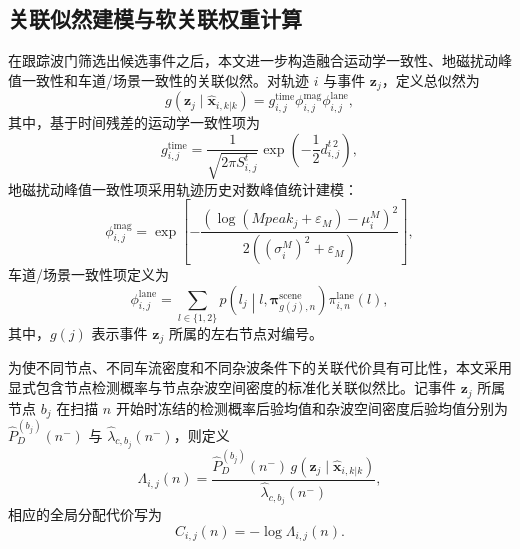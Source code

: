 \documentclass{xdupgthesis}
\begin{document}
\subsection{关联似然建模与软关联权重计算}

在跟踪波门筛选出候选事件之后，本文进一步构造融合运动学一致性、地磁扰动峰值一致性和车道/场景一致性的关联似然。对轨迹 $i$ 与事件 $\mathbf z_j$，定义总似然为
\begin{equation}
	g(\mathbf z_j\mid \hat{\mathbf x}_{i,k|k})
	=
	g_{i,j}^{\mathrm{time}}
	\phi_{i,j}^{\mathrm{mag}}
	\phi_{i,j}^{\mathrm{lane}},
	\label{eq:ch3_total_likelihood}
\end{equation}
其中，基于时间残差的运动学一致性项为
\begin{equation}
	g_{i,j}^{\mathrm{time}}
	=
	\frac{1}{\sqrt{2\pi S^{t}_{i,j}}}
	\exp\left(-\frac{1}{2}d^{t\,2}_{i,j}\right),
	\label{eq:ch3_g_time}
\end{equation}
地磁扰动峰值一致性项采用轨迹历史对数峰值统计建模：
\begin{equation}
	\phi_{i,j}^{\mathrm{mag}}
	=
	\exp\left[
	-\frac{
		\left(
		\log(Mpeak_j+\varepsilon_M)-\mu_i^{M}
		\right)^2
	}{2\left((\sigma_i^{M})^2+\varepsilon_M\right)}
	\right],
	\label{eq:ch3_phi_mag}
\end{equation}
车道/场景一致性项定义为
\begin{equation}
	\phi_{i,j}^{\mathrm{lane}}
	=
	\sum_{l\in\{1,2\}}
	p\!\left(l_j\middle|l,\boldsymbol\pi_{g(j),n}^{\mathrm{scene}}\right)
	\pi_{i,n}^{\mathrm{lane}}(l),
	\label{eq:ch3_phi_lane}
\end{equation}
其中，$g(j)$ 表示事件 $\mathbf z_j$ 所属的左右节点对编号。

为使不同节点、不同车流密度和不同杂波条件下的关联代价具有可比性，本文采用显式包含节点检测概率与节点杂波空间密度的标准化关联似然比。记事件 $\mathbf z_j$ 所属节点 $b_j$ 在扫描 $n$ 开始时冻结的检测概率后验均值和杂波空间密度后验均值分别为 $\hat P_D^{(b_j)}(n^-)$ 与 $\hat\lambda_{c,b_j}(n^-)$，则定义
\begin{equation}
	\Lambda_{i,j}(n)
	=
	\frac{\hat P_D^{(b_j)}(n^-)\,g(\mathbf z_j\mid \hat{\mathbf x}_{i,k|k})}{\hat\lambda_{c,b_j}(n^-)},
	\label{eq:ch3_assoc_ratio}
\end{equation}
相应的全局分配代价写为
\begin{equation}
	C_{i,j}(n)=-\log \Lambda_{i,j}(n).
	\label{eq:ch3_assoc_cost}
\end{equation}
\end{document}
